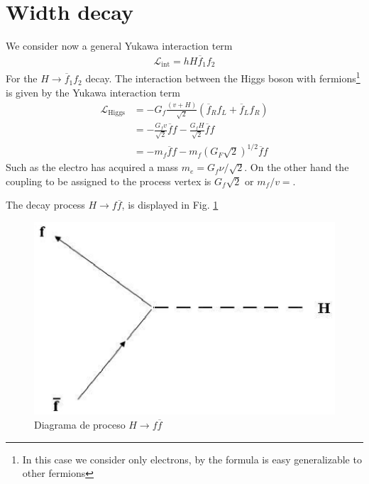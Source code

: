 \section{Width decay}
\label{sec:width-decay}
We consider now a general Yukawa interaction term
\begin{align}
  \mathcal{L}_{\text{int}}=hH\overline{f}_1 f_2
\end{align}
For the $H\to \overline{f}_1f_2$ decay.
The interaction between the Higgs boson with fermions\footnote{In this case we consider only electrons, by the formula is easy generalizable to other fermions} is given by the Yukawa interaction term \cite{lsm}
\begin{align}
\label{eq:155}
\mathcal{L}_{\text{Higgs}}&=-G_{f}\frac{(v+H)}{\sqrt{2}}(\overline{f}_{R}f_{L}+\overline{f}_{L}f_{R})\nonumber\\
&=-\frac{G_{f}v}{\sqrt{2}}\overline{f}f-\frac{G_{f}H}{\sqrt{2}}\overline{f}f\nonumber\\
&=-m_f\overline{f}f-m_f\left(G_{F}\sqrt{2}\right)^{1/2}\overline{f}f
\end{align}
Such as the electro has acquired a mass $m_{e}=G_{f}\nu/\sqrt{2}$. On the other hand the coupling to be assigned to the process vertex is 
$G_{f}\sqrt{2}$ or $m_{f}/v=$. 

The decay process $H\to f\overline{f}$, is displayed in Fig. 
\ref{fig:a} %

\begin{figure}[h!] %
\begin{center} %
\includegraphics[scale=0.5]{decay}%
\caption{Diagrama de proceso $H\to f\overline{f}$} %
\label{fig:a} %
\end{center} %
\end{figure} %

